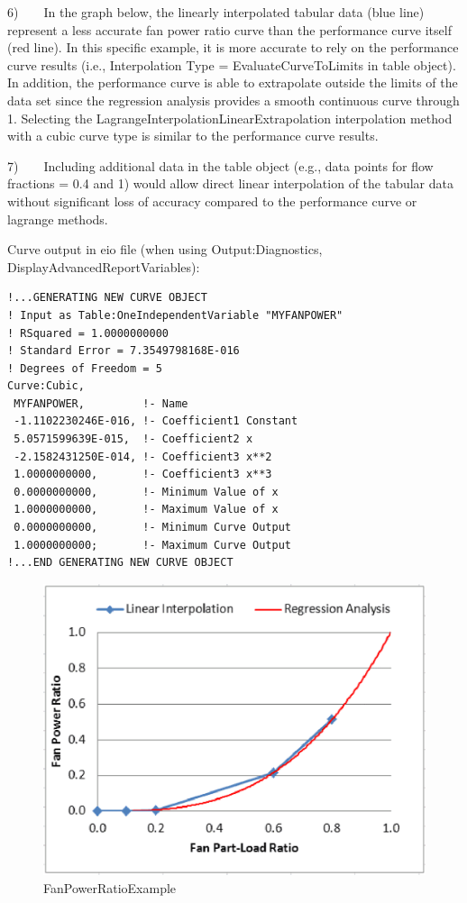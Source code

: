 6)~~~~In the graph below, the linearly interpolated tabular data (blue line) represent a less accurate fan power ratio curve than the performance curve itself (red line). In this specific example, it is more accurate to rely on the performance curve results (i.e., Interpolation Type = EvaluateCurveToLimits in table object). In addition, the performance curve is able to extrapolate outside the limits of the data set since the regression analysis provides a smooth continuous curve through 1. Selecting the LagrangeInterpolationLinearExtrapolation interpolation method with a cubic curve type is similar to the performance curve results.

7)~~~~Including additional data in the table object (e.g., data points for flow fractions = 0.4 and 1) would allow direct linear interpolation of the tabular data without significant loss of accuracy compared to the performance curve or lagrange methods.

Curve output in eio file (when using Output:Diagnostics, DisplayAdvancedReportVariables):

\begin{lstlisting}
!...GENERATING NEW CURVE OBJECT
! Input as Table:OneIndependentVariable "MYFANPOWER"
! RSquared = 1.0000000000
! Standard Error = 7.3549798168E-016
! Degrees of Freedom = 5
Curve:Cubic,
 MYFANPOWER,         !- Name
 -1.1102230246E-016, !- Coefficient1 Constant
 5.0571599639E-015,  !- Coefficient2 x
 -2.1582431250E-014, !- Coefficient3 x**2
 1.0000000000,       !- Coefficient3 x**3
 0.0000000000,       !- Minimum Value of x
 1.0000000000,       !- Maximum Value of x
 0.0000000000,       !- Minimum Curve Output
 1.0000000000;       !- Maximum Curve Output
!...END GENERATING NEW CURVE OBJECT
\end{lstlisting}

\begin{figure}[htbp]
\centering
\includegraphics{media/image7870.png}
\caption{FanPowerRatioExample}
\end{figure}

